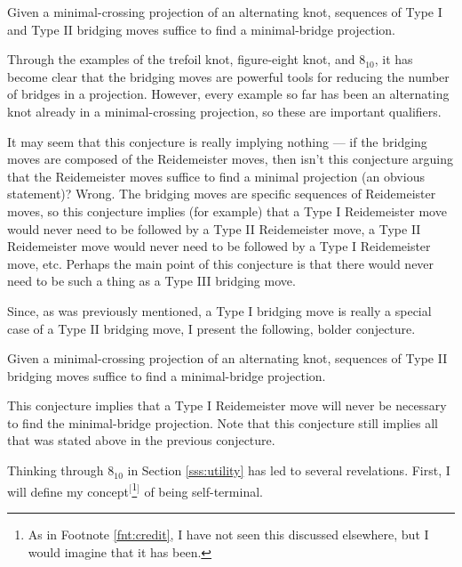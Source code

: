 \documentclass[titlepage]{article}
\begin{document}
\begin{conj}
    Given a minimal-crossing projection of an alternating knot, sequences of Type I and Type II bridging moves suffice to find a minimal-bridge projection.
\end{conj}

Through the examples of the trefoil knot, figure-eight knot, and $8_{10}$, it has become clear that the bridging moves are powerful tools for reducing the number of bridges in a projection. However, every example so far has been an alternating knot already in a minimal-crossing projection, so these are important qualifiers.\par
It may seem that this conjecture is really implying nothing --- if the bridging moves are composed of the Reidemeister moves, then isn't this conjecture arguing that the Reidemeister moves suffice to find a minimal projection (an obvious statement)? Wrong. The bridging moves are specific sequences of Reidemeister moves, so this conjecture implies (for example) that a Type I Reidemeister move would never need to be followed by a Type II Reidemeister move, a Type II Reidemeister move would never need to be followed by a Type I Reidemeister move, etc. Perhaps the main point of this conjecture is that there would never need to be such a thing as a Type III bridging move.\par
Since, as was previously mentioned, a Type I bridging move is really a special case of a Type II bridging move, I present the following, bolder conjecture.

\begin{conj}
    Given a minimal-crossing projection of an alternating knot, sequences of Type II bridging moves suffice to find a minimal-bridge projection.
\end{conj}

This conjecture implies that a Type I Reidemeister move will never be necessary to find the minimal-bridge projection. Note that this conjecture still implies all that was stated above in the previous conjecture.\par
Thinking through $8_{10}$ in Section \ref{sss:utility} has led to several revelations. First, I will define my concept$^[$\footnote{As in Footnote \ref{fnt:credit}, I have not seen this discussed elsewhere, but I would imagine that it has been.}$^]$ of being self-terminal.
\end{document}
